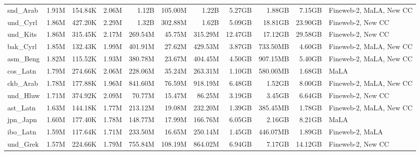 \begin{table*}[!htp]
{\begin{tabular}{l|rrr|rrr|rrr|l}
snd\_Arab                   & 1.91M      & 154.84K      & 2.06M       & 1.12B        & 105.00M        & 1.22B         & 5.27GB     & 1.88GB       & 7.15GB      & Fineweb-2, MaLA, New CC \\
und\_Cyrl                   & 1.86M      & 427.20K      & 2.29M       & 1.32B        & 302.88M        & 1.62B         & 5.09GB     & 18.81GB      & 23.90GB     & Fineweb-2, New CC       \\
und\_Kits                   & 1.86M      & 315.45K      & 2.17M       & 269.54M      & 45.75M         & 315.29M       & 12.47GB    & 17.12GB      & 29.58GB     & Fineweb-2, New CC       \\
bak\_Cyrl                   & 1.85M      & 132.43K      & 1.99M       & 401.91M      & 27.62M         & 429.53M       & 3.87GB     & 733.50MB     & 4.60GB      & Fineweb-2, MaLA, New CC \\
asm\_Beng                   & 1.82M      & 115.52K      & 1.93M       & 380.78M      & 23.67M         & 404.45M       & 4.50GB     & 907.15MB     & 5.40GB      & Fineweb-2, MaLA, New CC \\
cos\_Latn                   & 1.79M      & 274.66K      & 2.06M       & 228.06M      & 35.24M         & 263.31M       & 1.10GB     & 580.00MB     & 1.68GB      & MaLA                    \\
ckb\_Arab                   & 1.78M      & 177.88K      & 1.96M       & 841.60M      & 76.59M         & 918.19M       & 6.48GB     & 1.52GB       & 8.00GB      & Fineweb-2, MaLA, New CC \\
und\_Hluw                   & 1.71M      & 374.92K      & 2.09M       & 70.77M       & 15.47M         & 86.25M        & 3.19GB     & 3.45GB       & 6.64GB      & Fineweb-2, New CC       \\
ast\_Latn                   & 1.63M      & 144.18K      & 1.77M       & 213.12M      & 19.08M         & 232.20M       & 1.39GB     & 385.45MB     & 1.78GB      & Fineweb-2, MaLA, New CC \\
jpn\_Japn                   & 1.60M      & 177.40K      & 1.78M       & 148.77M      & 17.99M         & 166.76M       & 6.05GB     & 2.16GB       & 8.21GB      & MaLA                    \\
ibo\_Latn                   & 1.59M      & 117.64K      & 1.71M       & 233.50M      & 16.65M         & 250.14M       & 1.45GB     & 446.07MB     & 1.89GB      & Fineweb-2, MaLA         \\
und\_Grek                   & 1.57M      & 224.66K      & 1.79M       & 755.84M      & 108.19M        & 864.02M       & 6.94GB     & 7.17GB       & 14.12GB     & Fineweb-2, New CC       \\

\end{tabular}}
\end{table*}

